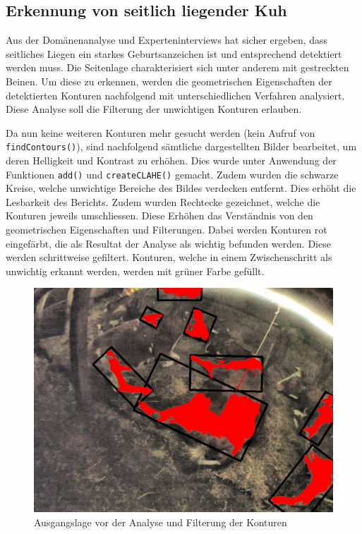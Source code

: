 \subsection{Erkennung von seitlich liegender Kuh}
Aus der Domänenanalyse und Experteninterviews hat sicher ergeben, dass seitliches Liegen ein starkes Geburtsanzeichen ist und entsprechend detektiert werden muss. Die Seitenlage charakterisiert sich unter anderem mit gestreckten Beinen. Um diese zu erkennen, werden die geometrischen Eigenschaften der detektierten Konturen nachfolgend mit unterschiedlichen Verfahren analysiert. Diese Analyse soll die Filterung der unwichtigen Konturen erlauben. 

 Da nun keine weiteren Konturen mehr gesucht werden (kein Aufruf von \texttt{findContours()}), sind nachfolgend sämtliche dargestellten Bilder bearbeitet, um deren Helligkeit und Kontrast zu erhöhen. Dies wurde unter Anwendung der Funktionen \texttt{add()} und \texttt{createCLAHE()} gemacht. Zudem wurden die schwarze Kreise, welche unwichtige Bereiche des Bildes verdecken entfernt. Dies erhöht die Lesbarkeit des Berichts. Zudem wurden Rechtecke gezeichnet, welche die Konturen jeweils umschliessen. Diese Erhöhen das Verständnis von den geometrischen Eigenschaften und Filterungen. Dabei werden Konturen rot eingefärbt, die als Resultat der Analyse als wichtig befunden werden. Diese werden schrittweise gefiltert. Konturen, welche in einem Zwischenschritt als unwichtig erkannt werden, werden mit grüner Farbe gefüllt. 

\begin{figure}[H]
	\center
	\includegraphics[scale=.43]{Grafiken/entwicklung/20StartImage.jpg}
	\caption{Ausgangslage vor der Analyse und Filterung der Konturen} 
	\label{fig: Ausgangslage vor der Analyse und Filterung der Konturen} 
\end{figure}

